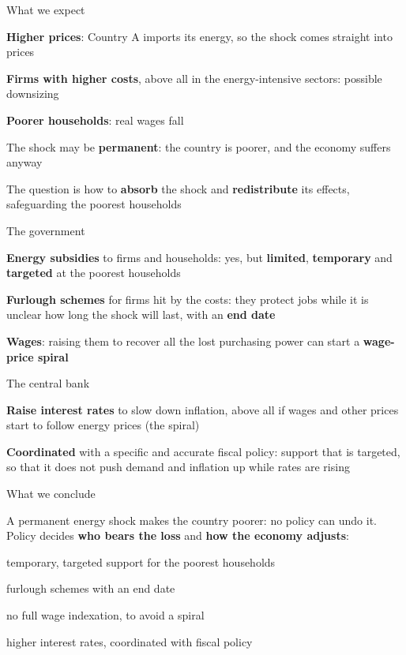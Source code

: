 \documentclass[aspectratio=169,xcolor=table]{beamer}
\begin{document}
\begin{frame}{What we expect}
\bi
  \item \textbf{Higher prices}: Country A imports its energy, so the shock comes straight into prices
  \item \textbf{Firms with higher costs}, above all in the energy-intensive sectors: possible downsizing
  \item \textbf{Poorer households}: real wages fall
  \item The shock may be \textbf{permanent}: the country is poorer, and the economy suffers anyway
\ei
\vspace{0.2cm}
\begin{block}{}
\centering The question is how to \textbf{absorb} the shock and \textbf{redistribute} its effects, safeguarding the poorest households
\end{block}
\end{frame}

\begin{frame}{The government}
\bi
  \item \textbf{Energy subsidies} to firms and households: yes, but \textbf{limited}, \textbf{temporary} and \textbf{targeted} at the poorest households
  \item \textbf{Furlough schemes} for firms hit by the costs: they protect jobs while it is unclear how long the shock will last, with an \textbf{end date}
  \item \textbf{Wages}: raising them to recover all the lost purchasing power can start a \textbf{wage-price spiral}
\ei
\end{frame}

\begin{frame}{The central bank}
\bi
  \item \textbf{Raise interest rates} to slow down inflation, above all if wages and other prices start to follow energy prices (the spiral)
  \item \textbf{Coordinated} with a specific and accurate fiscal policy: support that is targeted, so that it does not push demand and inflation up while rates are rising
\ei
\end{frame}

\begin{frame}{What we conclude}
\begin{block}{}
A permanent energy shock makes the country poorer: no policy can undo it. Policy decides \textbf{who bears the loss} and \textbf{how the economy adjusts}:
\bi
  \item temporary, targeted support for the poorest households
  \item furlough schemes with an end date
  \item no full wage indexation, to avoid a spiral
  \item higher interest rates, coordinated with fiscal policy
\ei
\end{block}
\end{frame}
\end{document}
